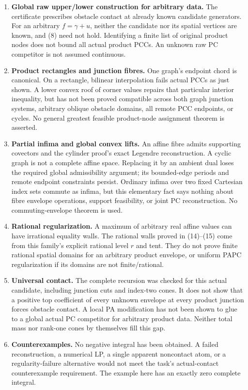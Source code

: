 \documentclass[
  10pt,
]{article}
\providecommand{\tightlist}{%
  \setlength{\itemsep}{0pt}\setlength{\parskip}{0pt}}
\begin{document}
\begin{enumerate}
\def\labelenumi{\arabic{enumi}.}
\tightlist
\item
  \textbf{Global raw upper/lower construction for arbitrary data.} The
  certificate prescribes obstacle contact at already known candidate
  generators. For an arbitrary \(f=\gamma+u\), neither the candidate nor
  its spatial vertices are known, and (8) need not hold. Identifying a
  finite list of original product nodes does not bound all actual
  product PCCs. An unknown raw PC competitor is not assumed continuous.
\item
  \textbf{Product rectangles and junction fibres.} One graph's endpoint
  chord is canonical. On a rectangle, bilinear interpolation fails
  actual PCCs as just shown. A lower convex roof of corner values
  repairs that particular interior inequality, but has not been proved
  compatible across both graph junction systems, arbitrary oblique
  obstacle domains, all remote PCC endpoints, or cycles. No general
  greatest feasible product-node assignment theorem is asserted.
\item
  \textbf{Partial infima and global convex lifts.} An affine fibre
  admits supporting covectors and the cylinder proof's exact Legendre
  reconstruction. A cyclic graph is not a complete affine space.
  Replacing it by an ambient dual loses the required global
  admissibility argument; its bounded-edge periods and remote endpoint
  constraints persist. Ordinary infima over two fixed Cartesian index
  sets commute as infima, but this elementary fact says nothing about
  fibre envelope operations, support feasibility, or joint PC
  reconstruction. No commuting-envelope theorem is used.
\item
  \textbf{Rational regularization.} A maximum of arbitrary real affine
  values can have irrational equality walls. The rational walls proved
  in (14)--(15) come from this family's explicit rational level \(r\)
  and tent. They do not prove finite rational spatial domains for an
  arbitrary product envelope, or uniform PAPC regularization if its
  domains are not finite/rational.
\item
  \textbf{Universal contact.} The complete recursion was checked for
  this actual candidate, including junction cuts and index-two cones. It
  does not show that a positive top coefficient of every unknown
  envelope at every product junction forces obstacle contact. A local PA
  modification has not been shown to glue to a global actual PC
  competitor for arbitrary product data. Neither total mass nor rank-one
  cones by themselves fill this gap.
\item
  \textbf{Counterexamples.} No negative integral has been obtained. A
  failed reconstruction, a numerical LP, a single apparent noncontact
  atom, or a regularity-failure alternative would not meet the task's
  actual-contact counterexample requirement. The example here has an
  exactly zero complete integral.
\end{enumerate}
\end{document}
